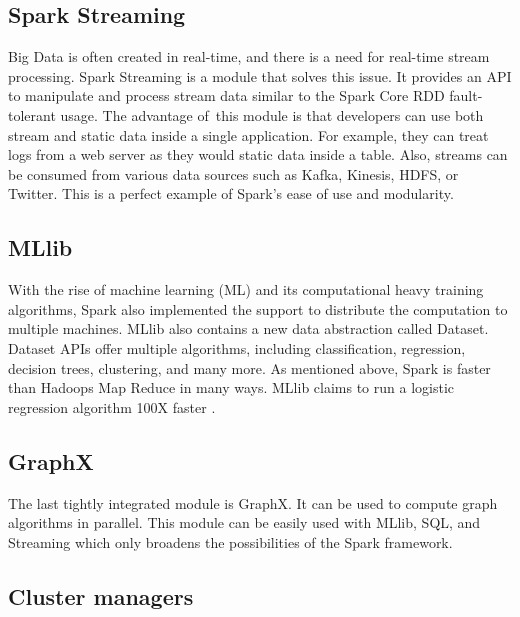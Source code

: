 \subsection*{Spark Streaming}

Big Data is often created in real-time, and there is a need for real-time stream processing. Spark Streaming is a module that solves this issue. It provides an API to manipulate and process stream data similar to the Spark Core RDD fault-tolerant usage. The advantage of~this module is that developers can use both stream and static data inside a single application. For example, they can treat logs from a web server as they would static data inside a table. Also, streams can be consumed from various data sources such as Kafka, Kinesis, HDFS, or Twitter. This is a perfect example of Spark's ease of use and modularity.



\subsection*{MLlib}

With the rise of machine learning (ML) and its computational heavy training algorithms, Spark also implemented the support to distribute the computation to multiple machines. MLlib also contains a new data abstraction called Dataset. Dataset APIs offer multiple algorithms, including classification, regression, decision trees, clustering, and many more. As mentioned above, Spark is faster than Hadoops Map Reduce in many ways. MLlib claims to run a logistic regression algorithm 100X faster \cite{MLlib}.

\subsection*{GraphX}

The last tightly integrated module is GraphX. It can be used to compute graph algorithms in parallel. This module can be easily used with MLlib, SQL, and Streaming which only broadens the possibilities of the Spark framework.


\label{sec:managers}
\subsection*{Cluster managers}

